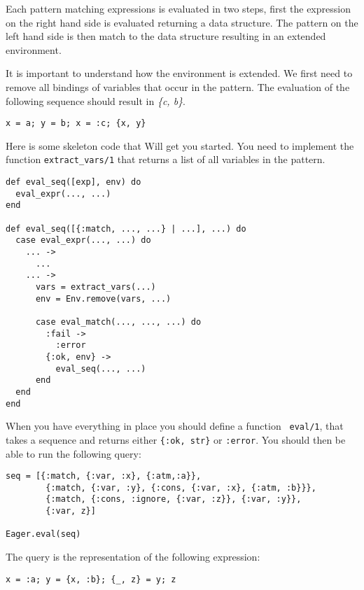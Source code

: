 \documentclass[a4paper,11pt]{article}
\begin{document}
Each pattern matching expressions is evaluated in two steps, first the
expression on the right hand side is evaluated returning a data
structure. The pattern on the left hand side is then match to the data
structure resulting in an extended environment.

It is important to understand how the environment is extended. We
first need to remove all bindings of variables that occur in the
pattern. The evaluation of the following sequence should result in {\em \{c, b\}}.

\begin{verbatim}
x = a; y = b; x = :c; {x, y}
\end{verbatim}

Here is some skeleton code that Will get you started. You need to
implement the function {\tt extract_vars/1} that returns a list of all
variables in the pattern.

\begin{verbatim}
def eval_seq([exp], env) do
  eval_expr(..., ...)
end

def eval_seq([{:match, ..., ...} | ...], ...) do
  case eval_expr(..., ...) do
    ... ->
      ...
    ... ->
      vars = extract_vars(...)
      env = Env.remove(vars, ...)

      case eval_match(..., ..., ...) do
        :fail ->
          :error
        {:ok, env} ->
          eval_seq(..., ...)
      end
  end
end
\end{verbatim}

When you have everything in place you should define a function {\tt
  eval/1}, that takes a sequence and returns either {\tt \{:ok, str\}}
or {\tt :error}. You should then be able to run the following query:

\begin{verbatim}
seq = [{:match, {:var, :x}, {:atm,:a}},
        {:match, {:var, :y}, {:cons, {:var, :x}, {:atm, :b}}},
        {:match, {:cons, :ignore, {:var, :z}}, {:var, :y}},
        {:var, z}]

Eager.eval(seq)
\end{verbatim}

The query is the representation of the following expression:

\begin{verbatim}
x = :a; y = {x, :b}; {_, z} = y; z
\end{verbatim}


\end{document}
